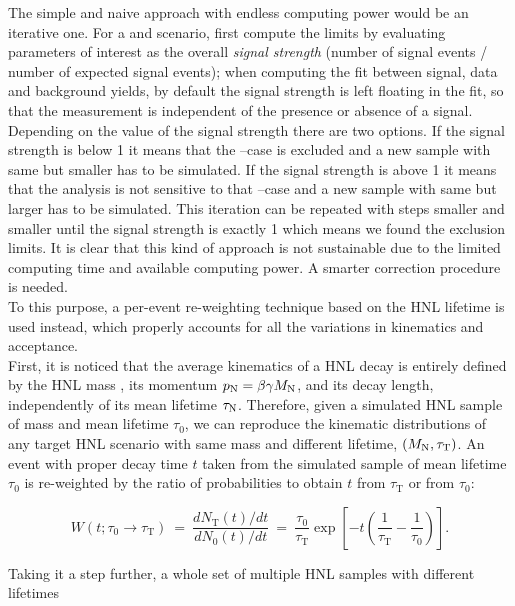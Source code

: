The simple and naive approach with endless computing power would be an
iterative one. For a \mhnl
and \mixpar scenario, first compute the limits by evaluating parameters
of interest as the overall \emph{signal strength} (number of signal events /
number of expected signal events); when computing the fit between
signal, data and background yields, by default the signal strength is
left floating in the fit, so that the measurement is independent of the
presence or absence of a signal. Depending on the value of the signal
strength there are two options. If the signal strength is below 1 it
means that the \mhnl --\mixpar case is excluded and a new sample with
same \mhnl but smaller \mixpar has to be simulated. If the signal strength is above 1 it
means that the analysis is not sensitive to that \mhnl --\mixpar case and a new sample with
same \mhnl but larger \mixpar has to be simulated. This iteration can
be repeated with steps smaller and smaller until the signal strength is
exactly 1 which means we found the exclusion limits. It is clear that
this kind of approach is not sustainable due to the limited computing
time and available computing power. A smarter correction procedure is needed.\\
To this purpose, a per-event re-weighting technique
based on the HNL lifetime is used instead, which properly accounts for all the
variations in kinematics and acceptance.\\
First, it is noticed that the average kinematics of a HNL decay
is entirely defined by the HNL mass \mhnl, its momentum
$p_\mathrm{N}=\beta\gamma M_{\mathrm{N}}$, and its decay length,
independently of its mean lifetime $\tau_\mathrm{N}$.
Therefore, given a simulated HNL sample of mass \mhnl
and mean lifetime $\tau_0$, we can reproduce the kinematic
distributions of any target HNL scenario with same mass and 
different lifetime, $(M_{\mathrm{N}}, \tau_{\mathrm T})$.
An event with proper decay time $t$ taken from the simulated sample
of mean lifetime $\tau_0$ is re-weighted by the ratio of
probabilities to obtain $t$ from $\tau_{\mathrm T}$ or from $\tau_0$:
\begin{linenomath}
  \begin{equation}
    W(t; \tau_0\to\tau_{\mathrm T}) ~=~ \frac{dN_{\mathrm T}(t)/dt}{dN_0(t)/dt} ~=~
    \frac{\tau_0}{\tau_{\mathrm T}}\exp{\left[-t\left(\frac{1}{\tau_{\mathrm T}}-\frac{1}{\tau_0}\right)\right]}.
  \label{eq:ctauReweightingSingle}
  \end{equation}
\end{linenomath}
Taking it a step further, a whole set of multiple HNL samples with different lifetimes
